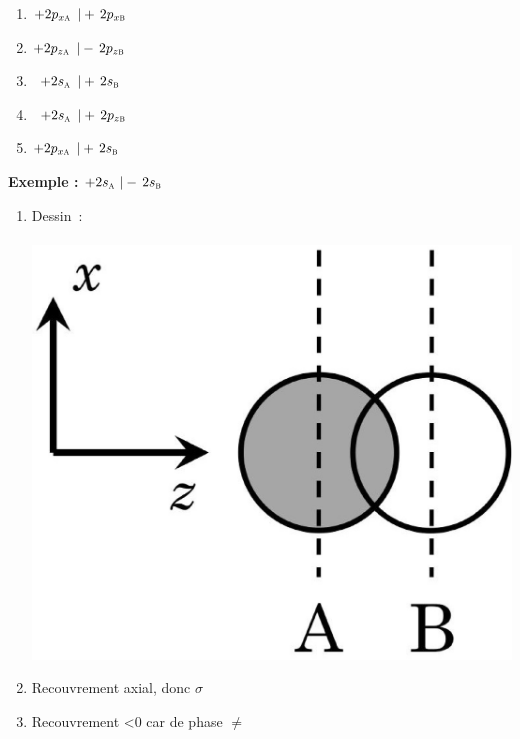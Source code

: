 \begin{minipage}[c]{0.5\linewidth}
\begin{enumerate}[\bf 1)]
\item $+2p_{x\textsc{a}}\ \, |+\,2p_{x\textsc{b}}$ 
\item $+2p_{z\textsc{a}}\ \, |-\,2p_{z\textsc{b}}$ 
\item $\ \, +2s_\textsc{a}\ \, |+\,2s_\textsc{b}$ 
\item $\ \, +2s_\textsc{a}\ \, |+\,2p_{z\textsc{b}}$ 
\item $+2p_{x\textsc{a}}\ \, |+\,2s_\textsc{b}$ 
\end{enumerate} 
\end{minipage} \hfill
\begin{minipage}[c]{0.5\linewidth}
 \textbf{Exemple :}  $+2s_\textsc{a}\ |-\,2s_\textsc{b}$
\begin{enumerate}[~~(i)] 
\item    Dessin~:\\[-0.3cm] 

   \  \  \  \  \   \includegraphics[scale=0.09]{figure/interactionOA.eps}
\item       Recouvrement axial, donc $\sigma$
\item       Recouvrement <0 car de phase $\neq $
\end{enumerate} 
\end{minipage}

